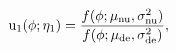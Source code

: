 \begin{equation}
  \text{u}_{1}(\phi; \eta_{1}) = 
  \frac {
    f(\phi; \mu_{\text{nu}}, \sigma^2_{\text{nu}})
  } {
    f(\phi; \mu_{\text{de}}, \sigma^2_{\text{de}})
  },
  \label{eqn:augmentation-definition}
\end{equation}
